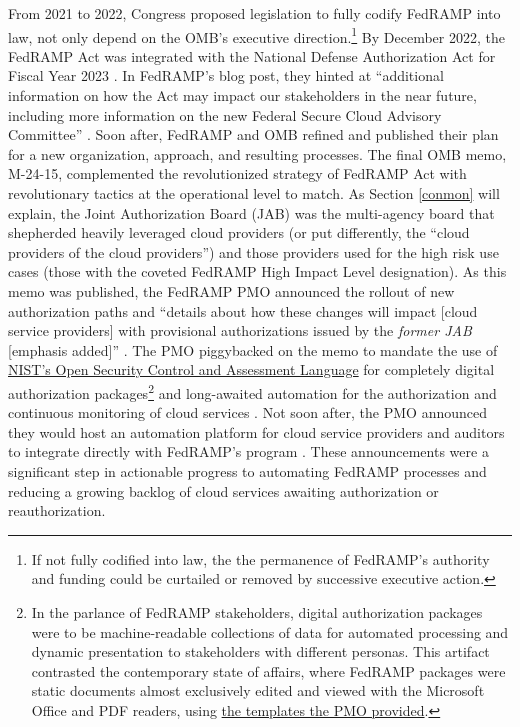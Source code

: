 \documentclass{jdf}
\begin{document}
From 2021 to 2022, Congress proposed legislation to fully codify FedRAMP into law, not only depend on the OMB's executive direction.\footnote{If not fully codified into law, the the permanence of FedRAMP's authority and funding could be curtailed or removed by successive executive action.} By December 2022, the FedRAMP Act was integrated with the National Defense Authorization Act for Fiscal Year 2023 \cite{ndaa2023}. In FedRAMP's blog post, they hinted at ``additional information on how the Act may impact our stakeholders in the near future, including more information on the new Federal Secure Cloud Advisory Committee'' \citeyear{fedramp_blog_ndaa2023}. Soon after, FedRAMP and OMB refined and published their plan for a new organization, approach, and resulting processes. The final OMB memo, M-24-15, complemented the revolutionized strategy of FedRAMP Act with revolutionary tactics at the operational level to match. As Section \ref{conmon} will explain, the Joint Authorization Board (JAB) was the multi-agency board that shepherded heavily leveraged cloud providers (or put differently, the ``cloud providers of the cloud providers'') and those providers used for the high risk use cases (those with the coveted FedRAMP High Impact Level designation). As this memo was published, the FedRAMP PMO announced the rollout of new authorization paths and ``details about how these changes will impact [cloud service providers] with provisional authorizations issued by the \textit{former JAB} [emphasis added]'' \citeyear{fedramp_blog_phase24}. The PMO piggybacked on the memo to mandate the use of \href{https://pages.nist.gov/OSCAL}{NIST's Open Security Control and Assessment Language} for completely digital authorization packages\footnote{In the parlance of FedRAMP stakeholders, digital authorization packages were to be machine-readable collections of data for automated processing and dynamic presentation to stakeholders with different personas. This artifact contrasted the contemporary state of affairs, where FedRAMP packages were static documents almost exclusively edited and viewed with the Microsoft Office and PDF readers, using \href{https://web.archive.org/web/20250524170225/https://www.fedramp.gov/rev5/documents-templates/}{the templates the PMO provided}.} and long-awaited automation for the authorization and continuous monitoring of cloud services \citeyear{fedramp_blog_phase24}. Not soon after, the PMO announced they would host an automation platform for cloud service providers and auditors to integrate directly with FedRAMP's program \citeyear{fedramp_blog_platform24}. These announcements were a significant step in actionable progress to automating FedRAMP processes and reducing a growing backlog of cloud services awaiting authorization or reauthorization.
\end{document}
